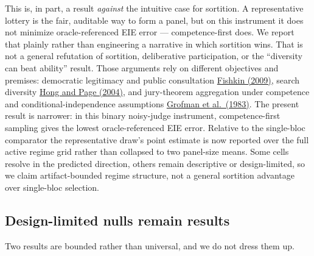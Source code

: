 \documentclass[
]{article}
\begin{document}
This is, in part, a result \emph{against} the intuitive case for
sortition. A representative lottery is the fair, auditable way to form a
panel, but on this instrument it does not minimize oracle-referenced EIE
error --- competence-first does. We report that plainly rather than
engineering a narrative in which sortition wins. That is not a general
refutation of sortition, deliberative participation, or the ``diversity
can beat ability'' result. Those arguments rely on different objectives
and premises: democratic legitimacy and public consultation
\href{https://global.oup.com/academic/product/when-the-people-speak-9780199604432}{Fishkin
(2009)}, search diversity
\href{https://doi.org/10.1073/pnas.0403723101}{Hong and Page (2004)},
and jury-theorem aggregation under competence and
conditional-independence assumptions
\href{https://doi.org/10.1007/BF00125672}{Grofman et al.~(1983)}. The
present result is narrower: in this binary noisy-judge instrument,
competence-first sampling gives the lowest oracle-referenced EIE error.
Relative to the single-bloc comparator the representative draw's point
estimate is now reported over the full active regime grid rather than
collapsed to two panel-size means. Some cells resolve in the predicted
direction, others remain descriptive or design-limited, so we claim
artifact-bounded regime structure, not a general sortition advantage
over single-bloc selection.

\subsection{Design-limited nulls remain
results}\label{design-limited-nulls-remain-results}

Two results are bounded rather than universal, and we do not dress them
up.
\end{document}
